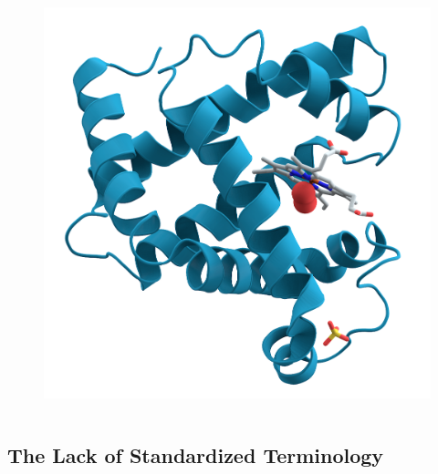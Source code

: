 \documentclass{beamer}
\begin{document}
\begin{frame}
\begin{columns}[b]
        \begin{column}{.3\textwidth}
            \begin{figure}
                \includegraphics[width=\linewidth]{assets/images/protein}
                \caption{\tiny \cite{protein}}
            \end{figure}
        \end{column}
    \end{columns}
\end{frame}

\subsection{The Lack of Standardized Terminology}
\end{document}
